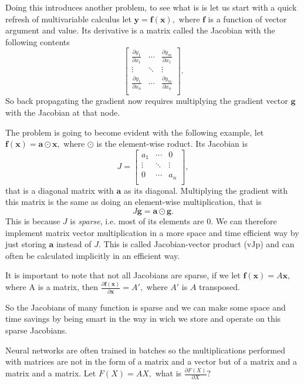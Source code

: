 \documentclass{article}
\newcommand{\partialfrac}[2]{\frac{\partial #1}{\partial #2}}
\newcommand{\hadam}{\odot} %
\renewcommand\vec[1]{\mathbf{#1}}
\begin{document}
Doing this introduces another problem, to see what is is let us start with a
quick refresh of multivariable calculus let \(\vec y = \vec f(\vec x),\) where
\(\vec f\) is a function of vector argument and value. Its derivative is a
matrix called the Jacobian with the following contents \[
\left[\begin{array}{ccc}
\partialfrac{y_1}{x_1} & \cdots & \partialfrac{y_m}{x_1} \\
\vdots & \ddots & \vdots \\
\partialfrac{y_1}{x_n} & \cdots & \partialfrac{y_m}{x_n} \\
\end{array}\right]\!.
\] So back propagating the gradient now requires multiplying the gradient
vector \(\vec g\) with the Jacobian at that node.

The problem is going to become evident with the following example, let \(\vec
f(\vec x) = \vec a \hadam \vec x,\) where \(\hadam\) is the element-wise
roduct. Its Jacobian is \[
J = \left[\begin{array}{ccc}
a_1 & \cdots & 0 \\
\vdots & \ddots & \vdots \\
0 & \cdots & a_n \\
\end{array}\right]\!,
\] that is a diagonal matrix with \(\vec a\) as its diagonal. Multiplying the
gradient with this matrix is the same as doing an element-wise multiplication,
that is \[
J \vec g = \vec a \hadam \vec g.
\] This is because \(J\) is \emph{sparse}, i.e. most of its elements are 0.
We can therefore implement matrix vector multiplication in a more space and
time efficient way by just storing \(\vec a\) instead of \(J.\) This is called
Jacobian-vector product (vJp) and can often be calculated implicitly in an
efficient way.

It is important to note that not all Jacobians are sparse, if we let \(\vec
f(\vec x) = A \vec x,\) where A is a matrix, then
\(\partialfrac{\vec f(\vec x)}{\vec x} = A',\) where \(A'\) is \(A\)
transposed.

So the Jacobians of many function is sparse and we can make some space and time
savings by being smart in the way in wich we store and operate on this sparse
Jacobians.

Neural networks are often trained in batches so the multiplications performed
with matrices are not in the form of a matrix and a vector but of a matrix and
a matrix and a matrix. Let \(F(X) = AX,\) what is \(\partialfrac{F(X)}{X}?\)
\end{document}
